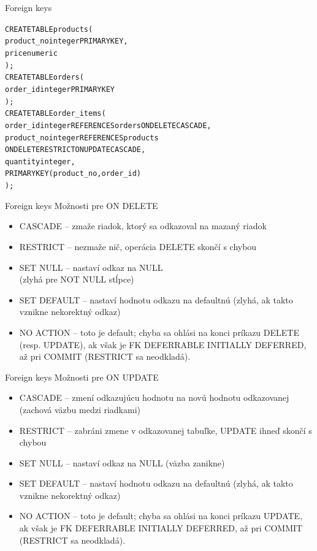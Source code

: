 \documentclass[12pt]{beamer}
\def\blue#1{\textcolor{Cerulean}{#1}}
\begin{document}
\begin{frame}[fragile]{Foreign keys}
\hbox{}{\small
\begin{alltt}
CREATE TABLE products (
  product_no integer PRIMARY KEY,
  price numeric
);
CREATE TABLE orders (
  order_id integer PRIMARY KEY
);
CREATE TABLE order_items (
  order_id integer \alert{REFERENCES orders} \blue{ON DELETE CASCADE},
  product_no integer \alert{REFERENCES products}
      \blue{ON DELETE RESTRICT ON UPDATE CASCADE},
  quantity integer,
  PRIMARY KEY (product_no, order_id)
);
\end{alltt}
}
\end{frame}

\begin{frame}[fragile]{Foreign keys}
Možnosti pre \blue{ON DELETE}
\begin{itemize}
\item \alert{CASCADE} -- zmaže riadok, ktorý sa odkazoval na mazaný riadok
\item \alert{RESTRICT} -- nezmaže nič, operácia DELETE skončí s chybou
\item SET NULL -- nastaví odkaz na NULL\\ (zlyhá pre NOT NULL stĺpce)
\item SET DEFAULT -- nastaví hodnotu odkazu na defaultnú
(zlyhá, ak takto vznikne nekorektný odkaz)
\item NO ACTION -- toto je default; chyba sa ohlási na konci príkazu DELETE (resp. UPDATE), ak však je FK DEFERRABLE INITIALLY DEFERRED, až pri COMMIT (RESTRICT sa neodkladá).
\end{itemize}
\end{frame}

\begin{frame}[fragile]{Foreign keys}
Možnosti pre \blue{ON UPDATE}
\begin{itemize}
\item \alert{CASCADE} -- zmení odkazujúcu hodnotu na novú hodnotu odkazovanej
(zachová väzbu medzi riadkami)
\item \alert{RESTRICT} -- zabráni zmene v odkazovanej tabuľke, UPDATE ihneď skončí s chybou
\item SET NULL -- nastaví odkaz na NULL (väzba zanikne)
\item SET DEFAULT -- nastaví hodnotu odkazu na defaultnú
(zlyhá, ak takto vznikne nekorektný odkaz)
\item NO ACTION -- toto je default; chyba sa ohlási na konci príkazu UPDATE, ak však je FK DEFERRABLE INITIALLY DEFERRED, až pri COMMIT (RESTRICT sa neodkladá).
\end{itemize}
\end{frame}
\end{document}
